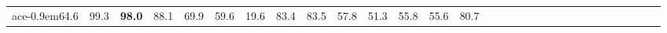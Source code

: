 \documentclass{article}
\begin{document}
\begin{table*}[]
\begin{tabular}{cc|cccccccccccccccccccccccccccc}
ace{-0.9em}64.6\hspace{-0.4em} & \hspace{-0.9em}99.3\hspace{-0.4em} & \hspace{-0.9em}\textbf{98.0}\hspace{-0.4em} & \hspace{-0.9em}88.1\hspace{-0.4em} & \hspace{-0.9em}69.9\hspace{-0.4em} & \hspace{-0.9em}59.6\hspace{-0.4em} & \hspace{-0.9em}19.6\hspace{-0.4em} & \hspace{-0.9em}83.4\hspace{-0.4em} & \hspace{-0.9em}83.5\hspace{-0.4em} & \hspace{-0.9em}57.8\hspace{-0.4em} & \hspace{-0.9em}51.3\hspace{-0.4em} & \hspace{-0.9em}55.8\hspace{-0.4em} & \hspace{-0.9em}55.6\hspace{-0.4em} & \hspace{-0.9em}80.7\hspace{-0.4em} 
        \\

\end{tabular}
\end{table*}
\end{document}
